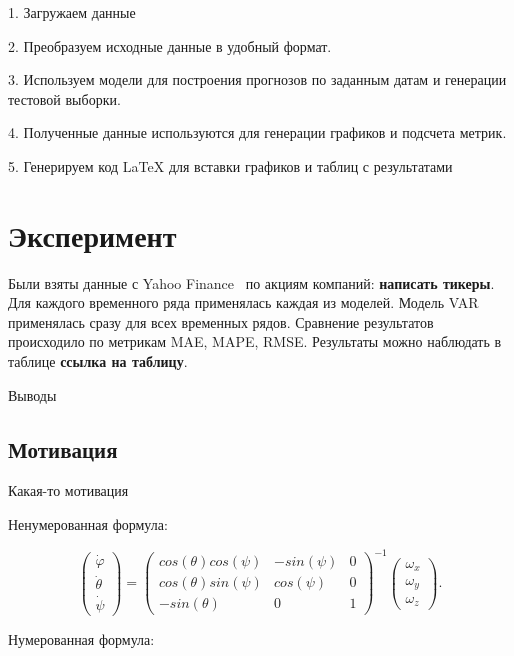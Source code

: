 \documentclass[a4paper,article,14pt]{extarticle}
\begin{document}
1.
Загружаем данные

2.
Преобразуем исходные данные в удобный формат.

3.
Используем модели для построения прогнозов по заданным датам и генерации тестовой выборки.

4.
Полученные данные используются для генерации графиков и подсчета метрик.

5.
Генерируем код LaTeX для вставки графиков и таблиц с результатами

\section{Эксперимент}

Были взяты данные с Yahoo Finance~\cite{yahoo} по акциям компаний: \textbf{написать тикеры}.
Для каждого временного ряда применялась каждая из моделей.
Модель VAR применялась сразу для всех временных рядов.
Сравнение результатов происходило по метрикам MAE, MAPE, RMSE.
Результаты можно наблюдать в таблице \textbf{ссылка на таблицу}.


Выводы

\subsection{Мотивация}

Какая-то мотивация

Ненумерованная формула:

\begin{equation}
    \begin{pmatrix} \dot{\varphi}\\ \dot{\theta} \\ \dot{\psi} \end{pmatrix}
    = \begin{pmatrix}
        cos(\theta)cos(\psi) & -sin(\psi) & 0 \\
        cos(\theta)sin(\psi) & cos(\psi)  & 0 \\
        -sin(\theta)         & 0         &  1
    \end{pmatrix}^{-1}
    \begin{pmatrix} \omega_x\\ \omega_y \\ \omega_z \end{pmatrix}.
\end{equation}

Нумерованная формула:
\end{document}
